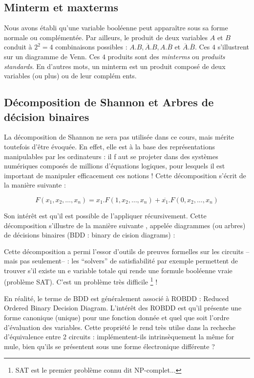 \subsection{Minterm et maxterms}
Nous avons établi qu'une variable booléenne peut apparaître sous sa forme normale ou complémentée.
Par ailleurs, le produit de deux variables $A$ et $B$ conduit à $2^2=4$ combinaisons possibles : $A.B,\overline{A}.B,A.\overline{B}$ et $\overline{A}.\overline{B}$. Ces $4$ s'illustrent sur
un diagramme de Venn. Ces $4$ produits sont des {\it minterms} ou {\it produits standards}. En d'autres mots, un minterm est un produit composé de deux variables (ou plus) ou de leur complém
ents.

\subsection{Décomposition de Shannon et Arbres de décision binaires}
La décomposition de Shannon ne sera pas utilisée dans ce cours, mais mérite toutefois d'être évoquée. En effet, elle est à la base des représentations manipulables par les ordinateurs : il f
aut se projeter dans des systèmes numériques composés de millions d'équations logiques, pour lesquels il est important de manipuler efficacement ces notions ! Cette décomposition s'écrit de
la manière suivante :

$$F(x_1,x_2,\dots,x_n)=x_1.F(1,x_2,\dots,x_n) + \overline{x_1}.F(0,x_2,\dots,x_n)$$


Son intérêt est qu'il est possible de l'appliquer récursivement. Cette décomposition s'illustre de la manière suivante , appelée diagrammes (ou arbres) de décisions binaires (BDD : binary de
cision diagrams) :


Cette décomposition a permi l'essor d'outils de preuves formelles sur les circuits --mais pas seulement-- : les ``solvers'' de satisfiabilité par exemple permettent de trouver s'il existe un
e variable totale qui rende une formule booléenne vraie (problème SAT). C'est un problème très difficile \footnote{SAT est le premier problème connu dit NP-complet...} !

En réalité, le terme de BDD est généralement associé à ROBDD : Reduced Ordered Binary Decision Diagram. L'intérêt des ROBDD est qu'il présente une forme canonique (unique) pour une fonction
donnée et quel que soit l'ordre d'évaluation des variables. Cette propriété le rend très utilse dans la recheche d'équivalence entre 2 circuits : implémentent-ils intrinsèquement la même for
mule, bien qu'ils se présentent sous une forme électronique différente ?

